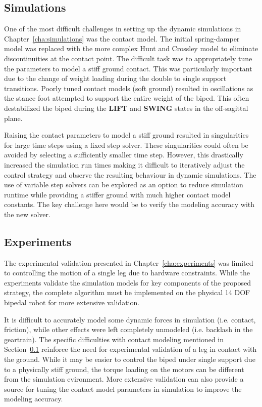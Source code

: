 \subsection{Simulations} %
\label{sub:simulations}
One of the most difficult challenges in setting up the dynamic simulations in Chapter~\ref{cha:simulations} was the contact model. The initial spring-damper model was replaced with the more complex Hunt and Crossley model to eliminate discontinuities at the contact point. The difficult task was to appropriately tune the parameters to model a stiff ground contact. This was particularly important due to the change of weight loading during the double to single support transitions. Poorly tuned contact models (soft ground) resulted in oscillations as the stance foot attempted to support the entire weight of the biped. This often destabilized the biped during the \textbf{LIFT} and \textbf{SWING} states in the off-sagittal plane. 

Raising the contact parameters to model a stiff ground resulted in singularities for large time steps using a fixed step solver. These singularities could often be avoided by selecting a sufficiently smaller time step. However, this drastically increased the simulation run times making it difficult to iteratively adjust the control strategy and observe the resulting behaviour in dynamic simulations. The use of variable step solvers can be explored as an option to reduce simulation runtime while providing a stiffer ground with much higher contact model constants. The key challenge here would be to verify the modeling accuracy with the new solver. 

\subsection{Experiments} %
\label{sub:experiments}
The experimental validation presented in Chapter~\ref{cha:experiments} was limited to controlling the motion of a single leg due to hardware constraints. While the experiments validate the simulation models for key components of the proposed strategy, the complete algorithm must be implemented on the physical 14 DOF bipedal robot for more extensive validation. 

It is difficult to accurately model some dynamic forces in simulation (i.e. contact, friction), while other effects were left completely unmodeled (i.e. backlash in the geartrain). The specific difficulties with contact modeling mentioned in Section~\ref{sub:simulations} reinforce the need for experimental validation of a leg in contact with the ground. While it may be easier to control the biped under single support due to a physically stiff ground, the torque loading on the motors can be different from the simulation evironment. More extensive validation can also provide a source for tuning the contact model parameters in simulation to improve the modeling accuracy. 

